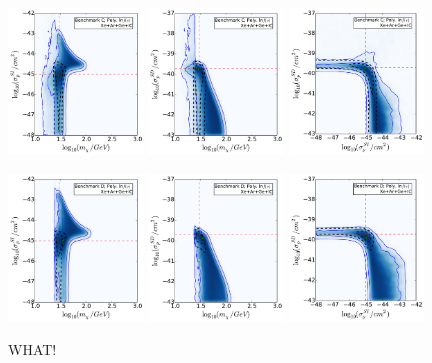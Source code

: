 \begin{figure}[!ht]
  \includegraphics[width=0.32\textwidth]{NT/BenchmarkC_poly-mx_sigsi.pdf}
  \includegraphics[width=0.32\textwidth]{NT/BenchmarkC_poly-mx_sigsd.pdf}
  \includegraphics[width=0.32\textwidth]{NT/BenchmarkC_poly-sigsi_sigsd.pdf}

  \includegraphics[width=0.32\textwidth]{NT/BenchmarkD_poly-mx_sigsi.pdf}
  \includegraphics[width=0.32\textwidth]{NT/BenchmarkD_poly-mx_sigsd.pdf}
  \includegraphics[width=0.32\textwidth]{NT/BenchmarkD_poly-sigsi_sigsd.pdf}
\caption{WHAT!}
\end{figure}

